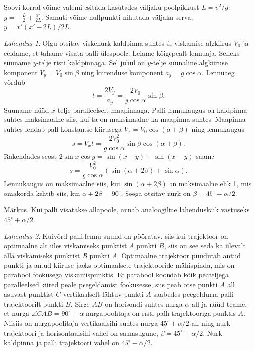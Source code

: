 \documentclass[10pt]{article}
\begin{document}
Soovi korral võime valemi esitada kasutades väljaku poolpikkust $L=v^2/g$: $y=-\frac L2+\frac{x^2}{2L}$. Samuti võime nullpunkti nihutada väljaku serva, $y=x'(x'-2L)/2L$.
\probend
\bigskip


\solu
\emph{Lahendus 1:} Olgu otsitav viskenurk kaldpinna suhtes $\beta$, viskamise algkiirus $V_0$ ja eeldame, et tahame visata palli ülespoole. Leiame kõigepealt lennuaja. Selleks suuname $y$-telje risti kaldpinnaga. Sel juhul on $y$-telje suunaline algkiiruse komponent $V_y=V_0\sin\beta$ ning kiirenduse komponent $a_y=g\cos\alpha$. Lennuaeg võrdub
$$t=\frac{2V_y}{a_y}=\frac{2V_0}{g\cos\alpha}\sin\beta.$$
Suuname nüüd $x$-telje paralleelselt maapinnaga. Palli lennukaugus on kaldpinna suhtes maksimaalne siis, kui ta on maksimaalne ka maapinna suhtes. Maapinna suhtes lendab pall konstantse kiirusega $V_x=V_0\cos(\alpha+\beta)$ ning lennukaugus
$$s=V_xt=\frac{2V_0^2}{g\cos\alpha}\sin\beta\cos(\alpha+\beta).$$
Rakendades seost $2\sin x\cos y=\sin(x+y)+\sin(x-y)$ saame
$$s=\frac{V_0^2}{g\cos\alpha}(\sin(\alpha+2\beta)+\sin\alpha).$$
Lennukaugus on maksimaalne siis, kui $\sin(\alpha+2\beta)$ on maksimaalne ehk 1, mis omakorda kehtib siis, kui $\alpha+2\beta=90^\circ$. Seega otsitav nurk on $\beta =45^\circ-\alpha /2$.

Märkus. Kui palli visatakse allapoole, annab analoogiline lahenduskäik vastuseks $45^\circ+\alpha /2$.

\emph{Lahendus 2:} Kuivõrd palli lennu suund on pööratav, siis kui trajektoor on optimaalne alt üles viskamiseks punktist $A$ punkti $B$, siis on see seda ka ülevalt alla viskamiseks punktist $B$ punkti $A$. Optimaalne trajektoor puudutab antud punkti ja antud kiiruse jaoks optimaalsete trajektooride mähispinda, mis on parabool fookusega viskamispunktis. Et parabool koondab kõik peateljega paralleelsed kiired peale peegeldamist fookusesse, siis peab otse punkti $A$ all asuvast punktist $C$ vertikaalselt lähtuv punkti $A$ saabudes peegelduma palli trajektoorilt punkti $B$. Sirge $AB$ on horisondi suhtes nurga $\alpha$ all ja nüüd teame, et nurga $\angle CAB=90^\circ +\alpha$ nurgapoolitaja on risti palli trajektooriga punktis $A$. Niisiis on nurgapoolitaja vertikaalsihi suhtes nurga $45^\circ +\alpha/2$ all ning nurk trajektoori ja horisontaalsihi vahel on samasugune, $\beta = 45^\circ +\alpha/2$. Nurk kaldpinna ja palli trajektoori vahel on $45^\circ -\alpha/2$.
\end{document}
